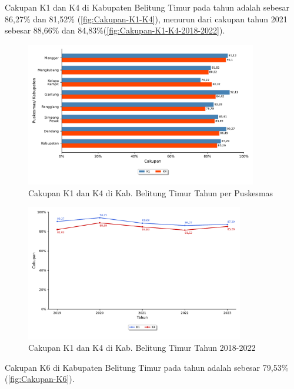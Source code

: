 Cakupan K1 dan K4 di Kabupaten Belitung Timur pada tahun \tP adalah sebesar 86,27\% dan 81,52\% (\autoref{fig:Cakupan-K1-K4}), menurun dari cakupan tahun 2021 sebesar 88,66\% dan 84,83\%(\autoref{fig:Cakupan-K1-K4-2018-2022}).

\begin{figure}[H]
    \centering{}
    \includegraphics[width=0.9\textwidth]{bab_05/bab_05_03_K1K4}
    \caption{Cakupan K1 dan K4 di Kab. Belitung Timur Tahun \tP per Puskesmas}
    \label{fig:Cakupan-K1-K4}
\end{figure}

\begin{figure}[H]
    \centering{}
    \includegraphics[width=0.85\textwidth]{bab_05/bab_05_03a_plotK1K4}
    \caption{Cakupan K1 dan K4 di Kab. Belitung Timur Tahun 2018-2022}
    \label{fig:Cakupan-K1-K4-2018-2022}
\end{figure}

Cakupan K6 di Kabupaten Belitung Timur pada tahun \tP adalah sebesar 79,53\% (\autoref{fig:Cakupan-K6}).

